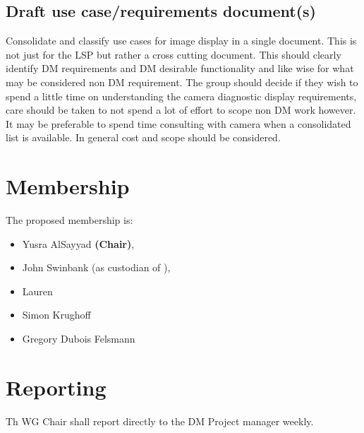 \subsection{Draft use case/requirements document(s)}
Consolidate and classify use cases for image display in a single document. This is not just for the \gls{LSP} but rather a cross cutting document. This should clearly identify \gls{DM} requirements and \gls{DM} desirable functionality and like wise for what may be considered non \gls{DM} requirement.
The group should decide if they wish to spend a little time on understanding the camera diagnostic display requirements, care should be taken to not spend a lot of effort to scope non \gls{DM} work however. It may be preferable to spend time consulting with camera when a consolidated list is available.
In general cost and scope should be considered.


\section{Membership}

The proposed membership is:

\begin{itemize}
  \item Yusra AlSayyad \textbf{(Chair)},
  \item John Swinbank (as custodian of ),
  \item Lauren
  \item Simon Krughoff
  \item Gregory Dubois Felsmann
\end{itemize}

\section{Reporting}

Th \gls{WG} Chair shall report directly to the \gls{DM} Project manager weekly.

